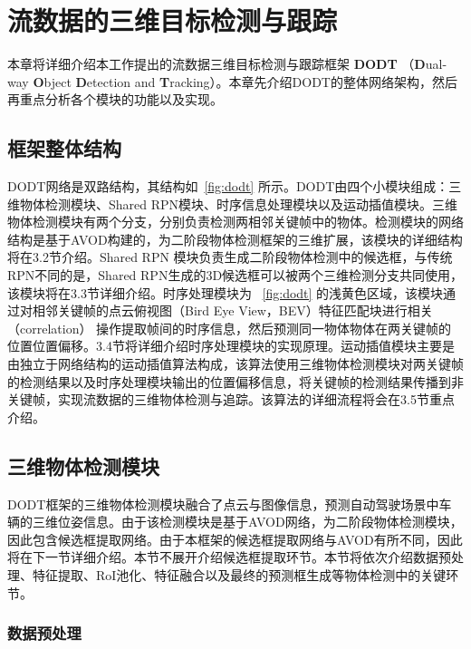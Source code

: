 
\chapter{流数据的三维目标检测与跟踪}
\label{methodology}
本章将详细介绍本工作提出的流数据三维目标检测与跟踪框架 \textbf{DODT} （\textbf{D}ual-way \textbf{O}bject \textbf{D}etection and \textbf{T}racking）。本章先介绍DODT的整体网络架构，然后再重点分析各个模块的功能以及实现。

\section{框架整体结构}
\label{total_structure}


DODT网络是双路结构，其结构如\figurename \, \ref{fig:dodt} 所示。DODT由四个小模块组成：三维物体检测模块、Shared RPN模块、时序信息处理模块以及运动插值模块。三维物体检测模块有两个分支，分别负责检测两相邻关键帧中的物体。检测模块的网络结构是基于AVOD\cite{ku2018joint}构建的，为二阶段物体检测框架的三维扩展，该模块的详细结构将在3.2节介绍。Shared RPN 模块负责生成二阶段物体检测中的候选框，与传统RPN不同的是，Shared RPN生成的3D候选框可以被两个三维检测分支共同使用，该模块将在3.3节详细介绍。时序处理模块为 \figurename \, \ref{fig:dodt} 的浅黄色区域，该模块通过对相邻关键帧的点云俯视图（Bird Eye View，BEV）特征匹配块进行相关（correlation） 操作提取帧间的时序信息，然后预测同一物体物体在两关键帧的位置位置偏移。3.4节将详细介绍时序处理模块的实现原理。运动插值模块主要是由独立于网络结构的运动插值算法构成，该算法使用三维物体检测模块对两关键帧的检测结果以及时序处理模块输出的位置偏移信息，将关键帧的检测结果传播到非关键帧，实现流数据的三维物体检测与追踪。该算法的详细流程将会在3.5节重点介绍。


\section{三维物体检测模块}
\label{3d_detection_module}

DODT框架的三维物体检测模块融合了点云与图像信息，预测自动驾驶场景中车辆的三维位姿信息。由于该检测模块是基于AVOD\cite{ku2018joint}网络，为二阶段物体检测模块，因此包含候选框提取网络。由于本框架的候选框提取网络与AVOD有所不同，因此将在下一节详细介绍。本节不展开介绍候选框提取环节。本节将依次介绍数据预处理、特征提取、RoI池化、特征融合以及最终的预测框生成等物体检测中的关键环节。

\subsection{数据预处理}

